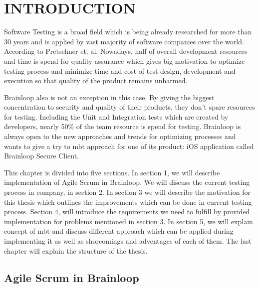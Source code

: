 \chapter{INTRODUCTION}
\label{chapter:introduction}

\par
Software Testing is a broad field which is being already researched for more than 30 years and is applied by vast majority of software companies over the world. According to Pretschner et. al. Nowadays, half of overall development resources and time is spend for quality assurance which gives big motivation to optimize testing process and minimize time and cost of test design, development and execution so that quality of the product remains unharmed.

\par
Brainloop also is not an exception in this case. By giving the biggest concentration to security and quality of their products, they don't spare resources for testing. Including the Unit and Integration tests which are created by developers, nearly 50\% of the team resource is spend for testing. Brainloop is always open to the new approaches and trends for optimizing processes and wants to give a try to \acrlong{mbt} approach for one of its product: iOS application called Brainloop Secure Client.

\par
This chapter is divided into five sections. In section 1, we will describe implementation of Agile Scrum in Brainloop. We will discuss the current testing process in company, in section 2. In section 3 we will describe the motivation for this thesis which outlines the improvements which can be done in current testing process. Section 4, will introduce the requirements we need to fulfill by provided implementation for problems mentioned in section 3. In section 5, we will explain concept of \acrlong{mbt} and discuss different approach which can be applied during implementing it as well as shorcomings and adventages of each of them. The last chapter will explain the structure of the thesis.

\section{Agile Scrum in Brainloop}

